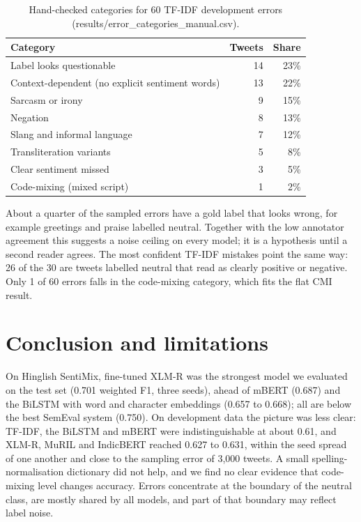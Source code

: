 \begin{table}[h]
\centering
\begin{tabular}{lrr}
\hline
Category & Tweets & Share \\
\hline
Label looks questionable & 14 & 23\% \\
Context-dependent (no explicit sentiment words) & 13 & 22\% \\
Sarcasm or irony & 9 & 15\% \\
Negation & 8 & 13\% \\
Slang and informal language & 7 & 12\% \\
Transliteration variants & 5 & 8\% \\
Clear sentiment missed & 3 & 5\% \\
Code-mixing (mixed script) & 1 & 2\% \\
\hline
\end{tabular}
\caption{Hand-checked categories for 60 TF-IDF development errors (results/error\_categories\_manual.csv).}
\label{tab:cats}
\end{table}

About a quarter of the sampled errors have a gold label that looks wrong, for example greetings and praise labelled
neutral. Together with the low annotator agreement \cite{patwa2020} this suggests a noise ceiling on every model; it is a
hypothesis until a second reader agrees. The most confident TF-IDF mistakes point the same way: 26 of the 30 are tweets
labelled neutral that read as clearly positive or negative. Only 1 of 60 errors falls in the code-mixing category, which fits the flat CMI result.

\section{Conclusion and limitations}
\label{sec:notdone}
On Hinglish SentiMix, fine-tuned XLM-R was the strongest model we evaluated on the test set (0.701 weighted F1, three seeds), ahead of mBERT (0.687) and the BiLSTM with word and character embeddings (0.657 to 0.668); all are below the best SemEval system (0.750). On development data the picture was less clear: TF-IDF, the BiLSTM and mBERT were indistinguishable at about 0.61, and XLM-R, MuRIL and IndicBERT reached 0.627 to 0.631, within the seed spread of one another and close to the sampling error of 3{,}000 tweets. A small spelling-normalisation dictionary did not help, and we find no clear evidence that code-mixing level changes
accuracy. Errors concentrate at the boundary of the neutral class, are mostly shared by all models, and part of that boundary
may reflect label noise.

